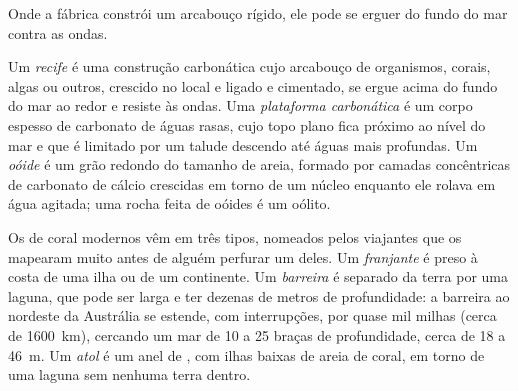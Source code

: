 Onde a fábrica constrói um arcabouço rígido, ele pode se erguer do fundo do mar contra
as ondas.

\begin{definition}\label{def:b1:chemical-biogenic-sediments:reef}
Um \emph{recife} é uma construção carbonática cujo arcabouço de organismos,
corais, algas ou outros, crescido no local e ligado e cimentado, se ergue acima do fundo
do mar ao redor e resiste às ondas. Uma \emph{plataforma carbonática} é um corpo espesso de
carbonato de águas rasas, cujo topo plano fica próximo ao nível do mar e que é limitado por um talude descendo até águas mais profundas.
Um \emph{oóide} é um grão redondo do tamanho de areia, formado por camadas
concêntricas de carbonato de cálcio crescidas em torno de um núcleo enquanto ele rolava
em água agitada; uma rocha feita de oóides é um oólito.
\end{definition}

Os  de coral modernos vêm em três tipos, nomeados pelos viajantes que os mapearam
muito antes de alguém perfurar um deles. Um  \emph{franjante} é preso à costa de
uma ilha ou de um continente. Um  \emph{barreira} é separado da terra por uma
laguna, que pode ser larga e ter dezenas de metros de profundidade: a barreira ao
nordeste da Austrália se estende, com interrupções, por quase mil milhas (cerca de
\qty{1600}{km}), cercando um mar de 10 a 25 braças de profundidade, cerca de 18 a
\qty{46}{m}. Um \emph{atol} é um anel de , com ilhas baixas de areia de coral, em
torno de uma laguna sem nenhuma terra dentro.

